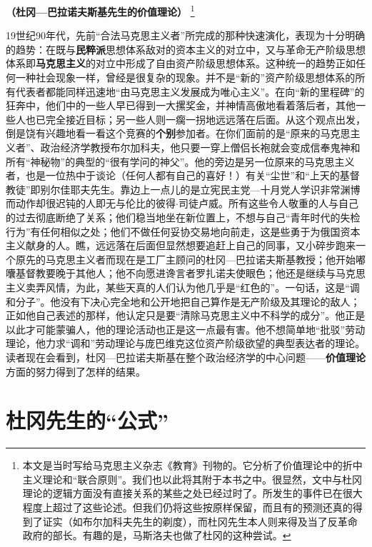\documentclass[fontset=fandol, a4paper, 12pt, openright]{ctexbook}
\begin{document}
\begin{center}
    \large\textbf{（杜冈—巴拉诺夫斯基先生的价值理论）}
    \footnote{本文是当时写给马克思主义杂志《教育》刊物的。它分析了价值理论中的折中主义理论和“联合原则”。我们也以此将其附于本书之中。很显然，文中与杜冈理论的逻辑方面没有直接关系的某些之处已经过时了。所发生的事件已在很大程度上超过了这些论述。但我们仍将这些按原样保留，而且有的预测还真的得到了证实（如布尔加科夫先生的剃度），而杜冈先生本人则来得及当了反革命政府的部长。有趣的是，马斯洛夫也做了杜冈的这种尝试。}
\end{center}

19世纪90年代，先前“合法马克思主义者”所完成的那种快速演化，表现为十分明确的趋势：在既与\textbf{民粹派}思想体系敌对的资本主义的对立中，又与革命无产阶级思想体系即\textbf{马克思主义}的对立中形成了自由资产阶级思想体系。这种统一的趋势正如任何一种社会现象一样，曾经是很复杂的现象。并不是“新的”资产阶级思想体系的所有代表者都能同样迅速地“由马克思主义发展成为唯心主义”。在向“新的里程碑”的狂奔中，他们中的一些人早已得到一大摞奖金，并神情高傲地看着落后者，其他一些人也已完全接近目标；另一些人则一瘸一拐地远远落在后面。从这个观点出发，倒是饶有兴趣地看一看这个竞赛的\textbf{个别}参加者。在你们面前的是“原来的马克思主义者”、政治经济学教授布尔加科夫，他只要一穿上僧侣长袍就会变成信奉鬼神和所有“神秘物”的典型的“很有学问的神父”。他的旁边是另一位原来的马克思主义者，也是一位热中于谈论（任何人都有自己的喜好！）有关“尘世”和“上天的基督教徒”即别尔佳耶夫先生。靠边上一点儿的是立宪民主党—十月党人学识非常渊博而动作却很迟钝的人即无与伦比的彼得$\cdot$司徒卢威。所有这些令人敬重的人与自己的过去彻底断绝了关系；他们稳当地坐在新位置上，不想与自己“青年时代的失检行为”有任何相似之处；他们不做任何妥协交易地向前走，这是些勇于为俄国资本主义献身的人。瞧，远远落在后面但显然想要追赶上自己的同事，又小碎步跑来一个原先的马克思主义者而现在是工厂主顾问的杜冈—巴拉诺夫斯基教授；他开始嘟囔基督教要晚于其他人；他不向愿进谗言者罗扎诺夫使眼色；他还是继续与马克思主义卖弄风情，为此，某些天真的人们认为他几乎是“红色的”。一句话，这是“调和分子”。他没有下决心完全地和公开地把自己算作是无产阶级及其理论的敌人；正如他自己表述的那样，他认定只是要“清除马克思主义中不科学的成分”。他正是以此才可能蒙骗人，他的理论活动也正是这一点最有害。他不想简单地“批驳”劳动理论，他力求“调和”劳动理论与庞巴维克这位资产阶级欲望的典型表达者的理论。读者现在会看到，杜冈—巴拉诺夫斯基在整个政治经济学的中心问题——\textbf{价值理论}方面的努力得到了怎样的结果。

\section{杜冈先生的“公式”}
\end{document}
